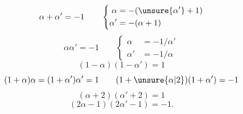 \[
\alpha+\alpha'=-1\qquad
\left\{\begin{aligned}\alpha&=-(\unsure{\alpha'}+1)\\\alpha'&=-(\alpha+1)\end{aligned}\right.
\]
\[
\alpha\alpha'=-1\qquad
\left\{\begin{aligned}\alpha&=-1/\alpha'\\\alpha'&=-1/\alpha\end{aligned}\right.
\]
\[
(1-\alpha)(1-\alpha')=1
\]
\[
(1+\alpha)\alpha=(1+\alpha')\alpha'=1\qquad(1+\unsure{\alpha|2})(1+\alpha')=-1
\]
\[
(\alpha+2)(\alpha'+2)=1
\]
\[
(2\alpha-1)(2\alpha'-1)=-1.
\]
